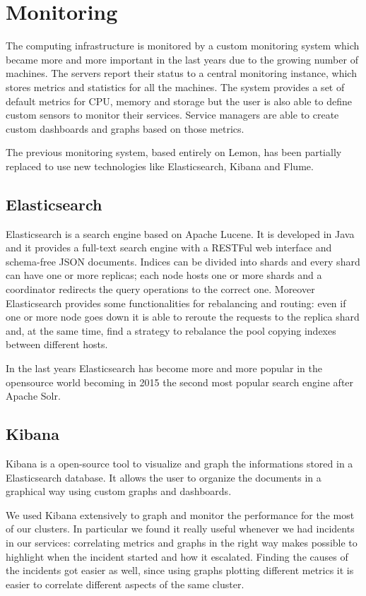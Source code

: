 \section{Monitoring}

The computing infrastructure is monitored by a custom monitoring system
which became more and more important in the last years due to the growing
number of machines. The servers report their status to a central
monitoring instance, which stores metrics and statistics for all the
machines. The system provides a set of default metrics for CPU, memory and
storage but the user is also able to define custom sensors to monitor
their services. Service managers are able to create custom dashboards and
graphs based on those metrics.

The previous monitoring system, based entirely on Lemon, has been
partially replaced to use new technologies like Elasticsearch, Kibana and
Flume. 

\subsection{Elasticsearch}

Elasticsearch is a search engine based on Apache Lucene. It is developed
in Java and it provides a full-text search engine with a RESTFul web
interface and schema-free JSON documents. Indices can be divided into
shards and every shard can have one or more replicas; each node hosts one
or more shards and a coordinator redirects the query operations to the
correct one. Moreover Elasticsearch provides some functionalities for
rebalancing and routing: even if one or more node goes down it is able to
reroute the requests to the replica shard and, at the same time, find
a strategy to rebalance the pool copying indexes between different
hosts.

In the last years Elasticsearch has become more and more popular in the
opensource world becoming in 2015 the second most popular search engine
after Apache Solr.

\subsection{Kibana}

Kibana is a open-source tool to visualize and graph the informations
stored in a Elasticsearch database. It allows the user to organize the
documents in a graphical way using custom graphs and dashboards.

We used Kibana extensively to graph and monitor the performance for the
most of our clusters. In particular we found it really useful whenever we
had incidents in our services: correlating metrics and graphs in the right
way makes possible to highlight when the incident started and how it
escalated. Finding the causes of the incidents got easier as well, since
using graphs plotting different metrics it is easier to correlate
different aspects of the same cluster.

